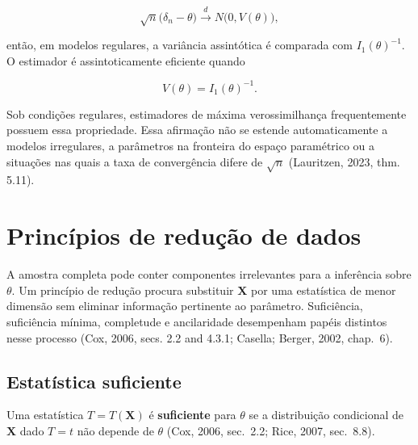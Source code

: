 \documentclass[
  letterpaper,
  DIV=11,
  numbers=noendperiod]{scrreprt}
\begin{document}
\[\sqrt{n}\bigl(\delta_n-\theta\bigr)
\xrightarrow{d}
N\bigl(0,V(\theta)\bigr),\]

então, em modelos regulares, a variância assintótica é comparada com
\(I_1(\theta)^{-1}\). O estimador é assintoticamente eficiente quando

\[V(\theta)=I_1(\theta)^{-1}.\]

Sob condições regulares, estimadores de máxima verossimilhança
frequentemente possuem essa propriedade. Essa afirmação não se estende
automaticamente a modelos irregulares, a parâmetros na fronteira do
espaço paramétrico ou a situações nas quais a taxa de convergência
difere de \(\sqrt{n}\) (Lauritzen, 2023, thm. 5.11).

\section{Princípios de redução de
dados}\label{princuxedpios-de-reduuxe7uxe3o-de-dados}

A amostra completa pode conter componentes irrelevantes para a
inferência sobre \(\theta\). Um princípio de redução procura substituir
\(\mathbf{X}\) por uma estatística de menor dimensão sem eliminar
informação pertinente ao parâmetro. Suficiência, suficiência mínima,
completude e ancilaridade desempenham papéis distintos nesse processo
(Cox, 2006, secs. 2.2 and 4.3.1; Casella; Berger, 2002, chap.~6).

\subsection*{Estatística suficiente}\label{estatuxedstica-suficiente}

\begin{tcolorbox}[enhanced jigsaw, colback=white, leftrule=.75mm, colbacktitle=quarto-callout-important-color!10!white, breakable, titlerule=0mm, bottomtitle=1mm, title=\textcolor{quarto-callout-important-color}{\faExclamation}\hspace{0.5em}{Definição --- Suficiência}, colframe=quarto-callout-important-color-frame, toprule=.15mm, opacityback=0, bottomrule=.15mm, opacitybacktitle=0.6, arc=.35mm, toptitle=1mm, rightrule=.15mm, coltitle=black, left=2mm]

Uma estatística \(T=T(\mathbf{X})\) é \textbf{suficiente} para
\(\theta\) se a distribuição condicional de \(\mathbf{X}\) dado \(T=t\)
não depende de \(\theta\) (Cox, 2006, sec.~2.2; Rice, 2007, sec.~8.8).

\end{tcolorbox}
\end{document}
